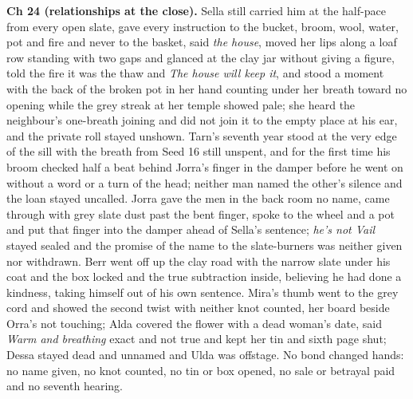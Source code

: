 \documentclass{design/chronicle}
\begin{document}
{\textbf{Ch 24 (relationships at the close).} Sella still carried him at the half-pace from every open slate, gave every instruction to the bucket, broom, wool, water, pot and fire and never to the basket, said \emph{the house}, moved her lips along a loaf row standing with two gaps and glanced at the clay jar without giving a figure, told the fire it was the thaw and \emph{The house will keep it}, and stood a moment with the back of the broken pot in her hand counting under her breath toward no opening while the grey streak at her temple showed pale; she heard the neighbour’s one-breath joining and did not join it to the empty place at his ear, and the private roll stayed unshown. Tarn’s seventh year stood at the very edge of the sill with the breath from Seed 16 still unspent, and for the first time his broom checked half a beat behind Jorra’s finger in the damper before he went on without a word or a turn of the head; neither man named the other’s silence and the loan stayed uncalled. Jorra gave the men in the back room no name, came through with grey slate dust past the bent finger, spoke to the wheel and a pot and put that finger into the damper ahead of Sella’s sentence; \emph{he’s not Vail} stayed sealed and the promise of the name to the slate-burners was neither given nor withdrawn. Berr went off up the clay road with the narrow slate under his coat and the box locked and the true subtraction inside, believing he had done a kindness, taking himself out of his own sentence. Mira’s thumb went to the grey cord and showed the second twist with neither knot counted, her board beside Orra’s not touching; Alda covered the flower with a dead woman’s date, said \emph{Warm and breathing} exact and not true and kept her tin and sixth page shut; Dessa stayed dead and unnamed and Ulda was offstage. No bond changed hands: no name given, no knot counted, no tin or box opened, no sale or betrayal paid and no seventh hearing.

}
\end{document}
